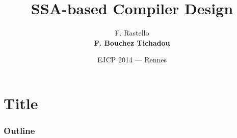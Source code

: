 \documentclass{beamer}
\title[SSA-based Compiler Design]{SSA-based Compiler Design}
\author[F. Bouchez Tichadou]%
{F. Rastello\inst{*}\\
\textbf{F. Bouchez Tichadou\inst{\dagger}}
}
\institute%
[UJF]%
{\inst{*}Inria\\
\inst{\dagger}Universit\'e Joseph Fourier
}
\date[EJCP'14]{EJCP 2014 --- Rennes}
\begin{document}
\section*{Title}
\mymaketitle



\begin{frame}
  \frametitle{Outline}
  \tableofcontents%
\end{frame}






\end{document}
